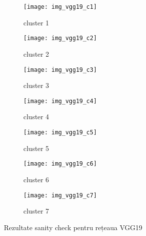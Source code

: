 \begin{figure}[!h]
  \centering
  \begin{subfigure}[t]{0.45\textwidth}
	\caption{cluster 1}    
    \texttt{[image: img\_vgg19\_c1]}
  \end{subfigure}
  \hfill
  \begin{subfigure}[t]{0.45\textwidth}
    \caption{cluster 2}
    \texttt{[image: img\_vgg19\_c2]}
  \end{subfigure}
   \hfill
  \begin{subfigure}[t]{0.45\textwidth}
    \caption{cluster 3}
    \texttt{[image: img\_vgg19\_c3]}
  \end{subfigure}
  \hfill
  \begin{subfigure}[t]{0.45\textwidth}
    \caption{cluster 4}
    \texttt{[image: img\_vgg19\_c4]}
  \end{subfigure}
  \hfill
  \begin{subfigure}[t]{0.45\textwidth}
    \caption{cluster 5}
    \texttt{[image: img\_vgg19\_c5]}
  \end{subfigure}
  \hfill
  \begin{subfigure}[t]{0.45\textwidth}
    \caption{cluster 6}
    \texttt{[image: img\_vgg19\_c6]}
  \end{subfigure}
    \hfill
  \begin{subfigure}[t]{0.45\textwidth}
    \caption{cluster 7}
    \texttt{[image: img\_vgg19\_c7]}
  \end{subfigure}
  \caption[Rezultate sanity check pentru rețeaua VGG19]{Rezultate sanity check pentru rețeaua VGG19}
\end{figure}

